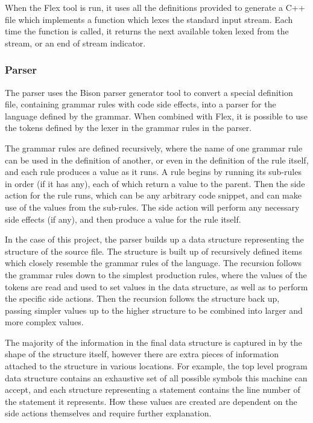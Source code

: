 \documentclass[11pt]{article}
\begin{document}
When the Flex tool is run, it uses all the definitions provided to generate a C++ file which implements a function which lexes the standard input stream. Each time the function is called, it returns the next available token lexed from the stream, or an end of stream indicator.

\subsubsection{Parser}

The parser uses the Bison parser generator tool to convert a special definition file, containing grammar rules with code side effects, into a parser for the language defined by the grammar. When combined with Flex, it is possible to use the tokens defined by the lexer in the grammar rules in the parser.

The grammar rules are defined recursively, where the name of one grammar rule can be used in the definition of another, or even in the definition of the rule itself, and each rule produces a value as it runs. A rule begins by running its sub-rules in order (if it has any), each of which return a value to the parent. Then the side action for the rule runs, which can be any arbitrary code snippet, and can make use of the values from the sub-rules. The side action will perform any necessary side effects (if any), and then produce a value for the rule itself.

In the case of this project, the parser builds up a data structure representing the structure of the source file. The structure is built up of recursively defined items which closely resemble the grammar rules of the language. The recursion follows the grammar rules down to the simplest production rules, where the values of the tokens are read and used to set values in the data structure, as well as to perform the specific side actions. Then the recursion follows the structure back up, passing simpler values up to the higher structure to be combined into larger and more complex values.

The majority of the information in the final data structure is captured in by the shape of the structure itself, however there are extra pieces of information attached to the structure in various locations. For example, the top level program data structure contains an exhaustive set of all possible symbols this machine can accept, and each structure representing a statement contains the line number of the statement it represents. How these values are created are dependent on the side actions themselves and require further explanation.
\end{document}
